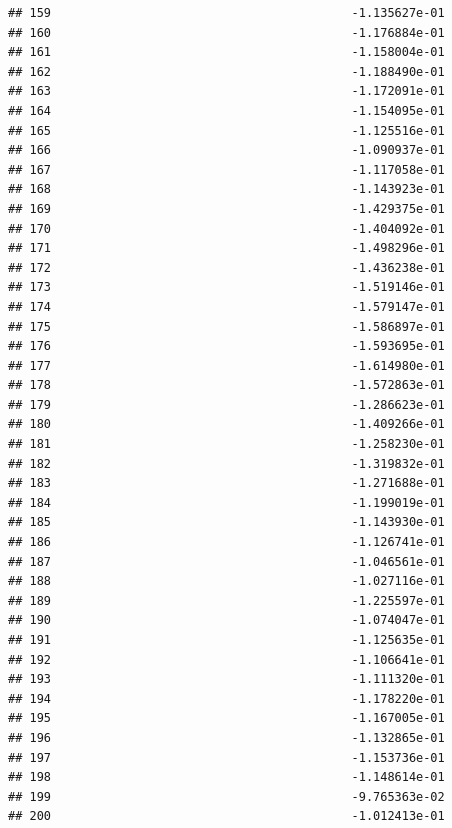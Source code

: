 \documentclass[
]{article}
\begin{document}
\begin{verbatim}
## 159                                          -1.135627e-01
## 160                                          -1.176884e-01
## 161                                          -1.158004e-01
## 162                                          -1.188490e-01
## 163                                          -1.172091e-01
## 164                                          -1.154095e-01
## 165                                          -1.125516e-01
## 166                                          -1.090937e-01
## 167                                          -1.117058e-01
## 168                                          -1.143923e-01
## 169                                          -1.429375e-01
## 170                                          -1.404092e-01
## 171                                          -1.498296e-01
## 172                                          -1.436238e-01
## 173                                          -1.519146e-01
## 174                                          -1.579147e-01
## 175                                          -1.586897e-01
## 176                                          -1.593695e-01
## 177                                          -1.614980e-01
## 178                                          -1.572863e-01
## 179                                          -1.286623e-01
## 180                                          -1.409266e-01
## 181                                          -1.258230e-01
## 182                                          -1.319832e-01
## 183                                          -1.271688e-01
## 184                                          -1.199019e-01
## 185                                          -1.143930e-01
## 186                                          -1.126741e-01
## 187                                          -1.046561e-01
## 188                                          -1.027116e-01
## 189                                          -1.225597e-01
## 190                                          -1.074047e-01
## 191                                          -1.125635e-01
## 192                                          -1.106641e-01
## 193                                          -1.111320e-01
## 194                                          -1.178220e-01
## 195                                          -1.167005e-01
## 196                                          -1.132865e-01
## 197                                          -1.153736e-01
## 198                                          -1.148614e-01
## 199                                          -9.765363e-02
## 200                                          -1.012413e-01

\end{verbatim}
\end{document}
